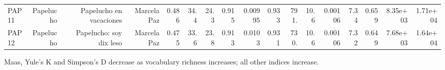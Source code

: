 \begin{table}[htbp]
\begin{tabular}{lrrrrrrrrrrrrrrrr}
PAP11 & Papelucho & Papelucho en vacaciones & Marcela Paz & 0.486 & 34.4 & 24.3 & 0.915 & 0.00995 & 0.933 & 791. & 10.6 & 0.00106 & 7.34 & 0.659 & 8.35e+03 & 1.71e+04 \\
PAP12 & Papelucho & Papelucho: soy dix leso & Marcela Paz & 0.475 & 33.6 & 23.8 & 0.913 & 0.0103 & 0.931 & 730. & 10.6 & 0.00106 & 7.32 & 0.649 & 7.68e+03 & 1.64e+04 \\
\bottomrule
\end{tabular}
\vspace{0.5em}
\begin{minipage}{\linewidth}\footnotesize Maas, Yule's K and Simpson's D decrease as vocabulary richness increases; all other indices increase.\end{minipage}
\end{table}

